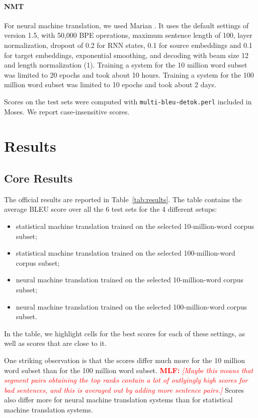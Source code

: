 \documentclass[11pt,a4paper]{article}
\newcommand{\todomlf}[1] {\textcolor{red}{\textbf{MLF:} \em [#1]}\marginpar{\textcolor{red}{\Large \textbf{!!!}}}}
\begin{document}
\paragraph{\bf NMT} For neural machine translation, we used Marian \citep{P18-4020}. It uses the default settings of version 1.5, with 50,000 BPE operations, maximum sentence length of 100, layer normalization, dropout of 0.2 for RNN states, 0.1 for source embeddings and 0.1 for target embeddings, exponential smoothing, and decoding with beam size 12 and length normalization (1). 
Training a system for the 10 million word subset was limited to 20 epochs and took about 10 hours. Training a system for the 100 million word subset was limited to 10 epochs and took about 2 days.

Scores on the test sets were computed with {\tt multi-bleu-detok.perl} included in Moses. We report case-insensitive scores.

\section{Results}

\subsection{Core Results}

The official results are reported in Table~\ref{tab:results}. The table contains the average BLEU score over all the 6 test sets for the 4 different setups:
\begin{itemize}\vspace{-2pt}\itemsep 0pt
\item statistical machine translation trained on the selected 10-million-word corpus subset; 
\item statistical machine translation trained on the selected 100-million-word corpus subset; 
\item neural machine translation trained on the selected 10-million-word corpus subset;
\item neural machine translation trained on the selected 100-million-word corpus subset. 
\end{itemize}

In the table, we highlight cells for the best scores for each of these settings, as well as scores that are close to it. 

One striking observation is that the scores differ much more for the 10 million word subset than for the 100 million word subset. \todomlf{Maybe this means that segment pairs obtaining the top ranks contain a lot of outlyingly high scores for bad sentences, and this is averaged out by adding more sentence pairs.} Scores also differ more for neural machine translation systems than for statistical machine translation systems.
\end{document}
